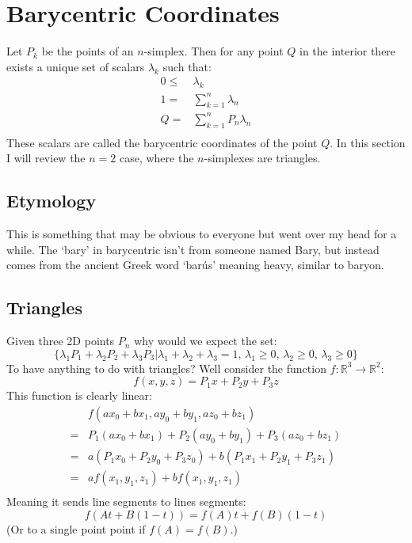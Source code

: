
\section{Barycentric Coordinates}
Let $P_k$ be the points of an $n$-simplex.
Then for any point $Q$ in the interior there exists a unique set of scalars $\lambda_k$ such that:
\begin{equation*}
\begin{aligned}
	0\leq&\lambda_k\\
	1=&\sum_{k=1}^n\lambda_n\\
	Q=&\sum_{k=1}^nP_n\lambda_n\\
\end{aligned}
\end{equation*}
These scalars are called the barycentric coordinates of the point $Q$.
In this section I will review the $n=2$ case, where the $n$-simplexes are triangles.

\subsection{Etymology}	
This is something that may be obvious to everyone but went over my head for a while.
The `bary' in barycentric isn't from someone named Bary,
but instead comes from the ancient Greek word `barús' meaning heavy,
similar to baryon.

\subsection{Triangles}
Given three 2D points $P_n$ why would we expect the set:
\[\{\lambda_1P_1+\lambda_2P_2+\lambda_3P_3|\lambda_1+\lambda_2+\lambda_3 = 1,\,\lambda_1 \geq 0,\,\lambda_2 \geq 0,\,\lambda_3 \geq 0\}\]
To have anything to do with triangles?
Well consider the function $f:\mathbb{R}^3\rightarrow\mathbb{R}^2$:
\[f(x,y,z) = P_1x+P_2y+P_3z\]
This function is clearly linear:
\begin{equation*}
\begin{aligned}
	&f(ax_0+bx_1,ay_0+by_1,az_0+bz_1)\\
	=&P_1(ax_0+bx_1) + P_2(ay_0+by_1)+P_3(az_0+bz_1)\\
	=&a(P_1x_0+P_2y_0+P_3z_0) + b(P_1x_1+P_2y_1+P_3z_1)\\
	=&af(x_1,y_1,z_1)+bf(x_1,y_1,z_1)\\
\end{aligned}
\end{equation*}
Meaning it sends line segments to lines segments:
\[f(At+B(1-t)) = f(A)t+f(B)(1-t)\] 
(Or to a single point point if $f(A)=f(B)$.)
\\

